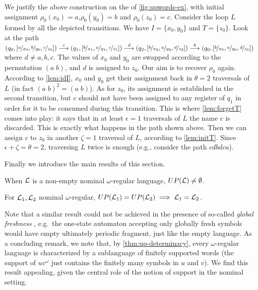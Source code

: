 \begin{example} We justify the above construction on the \hdma{} of \cref{fig:upwords-ex}, with initial assignment $\rho_0(x_0) = a$,$\rho_0(y_0) = b$ and $\rho_0(z_0) = c$. Consider the loop $L$ formed by all the depicted transitions. We have $I = \{x_0,y_0\}$ and $T = \{z_0\}$. Look at the path
$	(q_0,[\nicefrac{a}{x_0},\nicefrac{b}{y_0},\nicefrac{c}{z_0}]) \overset{c}{\longrightarrow} (q_1,[\nicefrac{b}{x_1},\nicefrac{a}{y_1},\nicefrac{c}{z_1}]) \overset{d}{\longrightarrow} (q_2,[\nicefrac{b}{x_2},\nicefrac{a}{y_2},\nicefrac{d}{z_2}])
	\overset{b}{\longrightarrow} (q_0,[\nicefrac{b}{x_0},\nicefrac{a}{y_0},\nicefrac{d}{z_0}])$
%
where $d \neq a,b,c$. The values of $x_0$ and $y_0$ are swapped according to the permutation $(a \; b)$, and $d$ is assigned to $z_0$. Our aim is to recover $\rho_0$ again. According to \cref{lem:idI}, $x_0$ and $y_0$ get their assignment back in $\theta = 2$ traversals of $L$ (in fact $(a\; b)^2 = (a\; b)$). As for $z_0$, its assignment is established in the second transition, but $c$ should not have been assigned to any register of $q_1$ in order for it to be consumed during this transition. This is where \cref{lem:forgetT} comes into play: it says that in at least $\epsilon = 1$ traversals of $L$ the name $c$ is discarded. This is exactly what happens in the path shown above. Then we can assign $c$ to $z_0$ in another $\zeta = 1$ traversal of $L$, according to \cref{lem:initT}. Since $\epsilon + \zeta  = \theta = 2$, traversing $L$ twice is enough (e.g., consider the path $cdbdca$).
\end{example}
%
\noindent Finally we introduce the main results of this section.
%
\begin{theorem}
\label{thm:up-fragment}
When $\mathcal{L}$ is a non-empty nominal $\omega$-regular language, $UP(\mathcal{L}) \neq \emptyset$.
\end{theorem}

\begin{theorem}
\label{thm:up-determinacy}
For $\mathcal{L}_1,\mathcal{L}_2$ nominal $\omega$-regular, $UP(\mathcal{L}_1) = UP(\mathcal{L}_2) \implies\mathcal{L}_1 = \mathcal{L}_2$.
\end{theorem}
% 
Note that a similar result could not be achieved in the presence of so-called \emph{global freshness} \cite{Tze11}, e.g.\ the one-state automaton accepting only globally fresh symbols would have empty ultimately periodic fragment, just like the empty language. As a concluding remark, we note that, by \cref{thm:up-determinacy}, every $\omega$-regular language is characterized by a sublanguage of finitely supported words (the support of $uv^\omega$ just contains the finitely many symbols in $u$ and $v$). We find this result appealing, given the central role of the notion of support in the nominal setting. 

